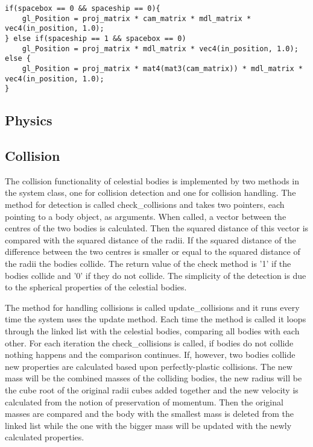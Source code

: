 \documentclass[a4paper,12pt]{article} \usepackage{graphicx}
\begin{document}
\begin{lstlisting}[caption={Vertex shader}, label={lst:vert}]
if(spacebox == 0 && spaceship == 0){
    gl_Position = proj_matrix * cam_matrix * mdl_matrix * vec4(in_position, 1.0);
} else if(spaceship == 1 && spacebox == 0)
    gl_Position = proj_matrix * mdl_matrix * vec4(in_position, 1.0);
else {
    gl_Position = proj_matrix * mat4(mat3(cam_matrix)) * mdl_matrix * vec4(in_position, 1.0);
} 
\end{lstlisting}

\subsection{Physics}
\subsection{Collision}
The collision functionality of celestial bodies is implemented by two methods in
the system class, one for collision detection and one for collision handling.
The method for detection is called check\_collisions and takes two pointers,
each pointing to a body object, as arguments. When called, a vector between the centres of the two
bodies is calculated. Then the squared distance of this vector is compared with
the squared distance of the radii. If the squared distance of the difference
between the two centres is smaller or equal to the squared distance of the radii
the bodies collide. The return value of the check method is '1' if the bodies
collide and '0' if they do not collide. The simplicity of the detection is due
to the spherical properties of the celestial bodies.

The method for handling collisions is called update\_collisions and it runs
every time the system uses the update method. Each time the method is called it loops
through the linked list with the celestial bodies, comparing all bodies with
each other. For each iteration the check\_collisions is called, if bodies do not
collide nothing happens and the comparison continues. If, however, two bodies
collide new properties are calculated based upon perfectly-plastic collisions. 
The new mass will be the combined masses of the colliding bodies, the new radius
will be the cube root of the original radii cubes added together and the new
velocity is calculated from the notion of preservation of momentum. Then the
original masses are compared and the body with the smallest mass is deleted from
the linked list while the one with the bigger mass will be updated with the
newly calculated properties.
\end{document}
